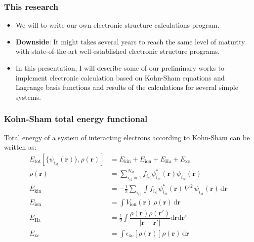 \documentclass[10pt,t]{beamer}
\begin{document}
\begin{frame}[c]
\frametitle{This research}
  
\begin{itemize}
\item We will to write our own electronic structure calculations program.

\item \textbf{Downside}: It might takes several years to reach the same level
of maturity with state-of-the-art well-established electronic structure programs.

\item In this presentation, I will describe some of our preliminary works to implement
electronic calculation based on
{\color{blue}Kohn-Sham equations} and {\color{blue}Lagrange basis functions}
and results of the calculations for
{\color{blue}several simple systems}.
\end{itemize}


\end{frame}




\begin{frame}[c]
\frametitle{Kohn-Sham total energy functional}

Total energy of a system of interacting electrons according to Kohn-Sham
can be written as:
\begin{align*}
E_{\mathrm{tot}}\left[\{\psi_{i_{st}}(\mathbf{r})\},\rho(\mathbf{r})\right] & =
E_{\mathrm{kin}} + E_{\mathrm{ion}} + E_{\mathrm{Ha}} + E_{\mathrm{xc}} \\
%
\rho(\mathbf{r}) & = \sum_{i_{st} = 1}^{N_{st}} f_{i_{st}} \psi^{*}_{i_{st}}(\mathbf{r})
\psi_{i_{st}}(\mathbf{r}) \\
%
E_{\mathrm{kin}} & = -\frac{1}{2}\sum_{i_{st}}
\int f_{i_{st}}
\psi_{i_{st}}^{*}(\mathbf{r})\,\nabla^2\,\psi_{i_{st}}(\mathbf{r})
\,\mathrm{d}\mathbf{r} \\
%
E_{\mathrm{ion}} & = \int V_{\mathrm{ion}}(\mathbf{r})\, \rho(\mathbf{r})\,
\mathrm{d}\mathbf{r} \\
%
E_{\mathrm{Ha}} & = \frac{1}{2} \int 
\dfrac{\rho(\mathbf{r})\rho(\mathbf{r}')}
{\left|\mathbf{r} - \mathbf{r}'\right|}
\mathrm{d}\mathbf{r}\mathrm{d}\mathbf{r}' \\
%
E_{\mathrm{xc}} & = \int \epsilon_{\mathrm{xc}}\left[\rho(\mathbf{r})\right]
\rho(\mathbf{r})\,\mathrm{d}\mathbf{r}
\end{align*}

\end{frame}
\end{document}
